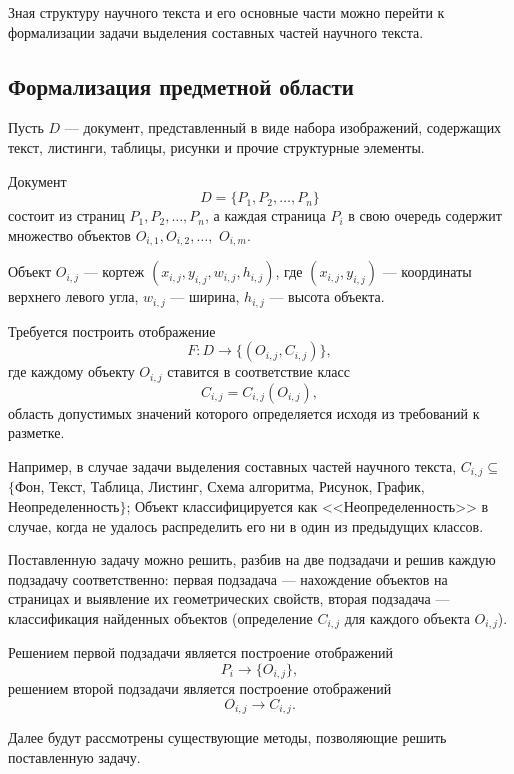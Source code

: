 %

Зная структуру научного текста и его основные части можно перейти к формализации задачи выделения составных частей научного текста.

\subsection{Формализация предметной области}

Пусть $ D $ --- документ, представленный в виде набора изображений, содержащих текст, листинги, таблицы, рисунки и прочие структурные элементы.

Документ
$$
D = \{ P_1, P_2 , \dots, P_n \}
$$
состоит из страниц $ P_1, P_2, \dots, P_n $, а каждая страница $ P_i $
в свою очередь содержит множество объектов $ O_{i,1}, O_{i,2}, \dots, $ $O_{i,m} $.

Объект $O_{i,j}$ --- кортеж $(x_{i,j}, y_{i,j}, w_{i,j}, h_{i,j})$, где $(x_{i,j}, y_{i,j})$ --- координаты верхнего левого угла, $w_{i,j}$ --- ширина, $h_{i,j}$ --- высота объекта.

Требуется построить отображение
$$ F : D \to \{(O_{i,j}, C_{i,j})\}, $$
где каждому объекту $O_{i,j}$ ставится в соответствие класс
$$ C_{i,j} = C_{i,j}(O_{i,j}), $$
область допустимых значений которого определяется исходя из требований к разметке.

Например, в случае задачи выделения составных частей научного текста, $C_{i,j} \subseteq$ $\{${Фон, Текст, Таблица, Листинг, Схема алгоритма, Рисунок, График, Неопределенность}$\}$;
Объект классифицируется как <<Неопределенность>> в случае, когда не удалось распределить его ни в один из предыдущих классов.

Поставленную задачу можно решить, разбив на две подзадачи и решив каждую подзадачу соответственно: первая подзадача --- нахождение объектов на страницах и выявление их геометрических свойств, вторая подзадача --- классификация найденных объектов (определение $C_{i,j}$ для каждого объекта $O_{i,j}$).

Решением первой подзадачи является построение отображений
$$
P_i \to \{ O_{i,j} \},
$$
решением второй подзадачи является построение отображений
$$
O_{i,j} \to C_{i,j}.
$$

Далее будут рассмотрены существующие методы, позволяющие решить поставленную задачу.

